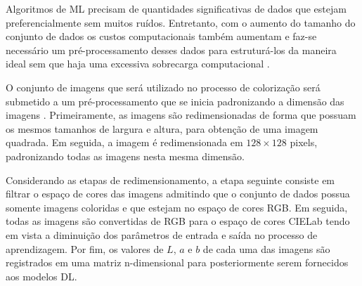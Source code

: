 Algoritmos de ML precisam de quantidades significativas de dados que estejam preferencialmente sem muitos ruídos. Entretanto, com o aumento do tamanho do conjunto de dados os custos computacionais também aumentam e faz-se necessário um pré-processamento desses dados para estruturá-los da maneira ideal sem que haja uma excessiva sobrecarga computacional \cite{ref:marsland}.

O conjunto de imagens que será utilizado no processo de colorização será submetido a um pré-processamento que se inicia padronizando a dimensão das imagens . Primeiramente, as imagens são redimensionadas de forma que possuam os mesmos tamanhos de largura e altura, para obtenção de uma imagem quadrada. Em seguida, a imagem é redimensionada em $128 \times 128$ pixels, padronizando todas as imagens nesta mesma dimensão.

Considerando as etapas de redimensionamento, a etapa seguinte consiste em filtrar o espaço de cores das imagens admitindo que o conjunto de dados possua somente imagens coloridas e que estejam no espaço de cores RGB. Em seguida, todas as imagens são convertidas de RGB para o espaço de cores CIELab tendo em vista a diminuição dos parâmetros de entrada e saída no processo de aprendizagem. Por fim, os valores de $L$, $a$ e $b$ de cada uma das imagens são registrados em uma matriz n-dimensional para posteriormente serem fornecidos aos modelos DL. 